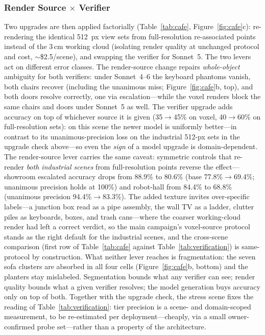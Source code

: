 \documentclass[electronics,article,accept,pdftex,moreauthors]{Definitions/mdpi}
\begin{document}
\subsubsection{Render Source $\times$ Verifier}
Two upgrades are then applied factorially (Table~\ref{tab:cafe},
Figure~\ref{fig:cafe}c): re-rendering the identical 512~px view sets
from full-resolution re-associated points instead of the 3\,cm working
cloud (isolating render quality at unchanged protocol and cost,
$\sim$\$2.5/scene), and swapping the verifier for Sonnet~5. The two
levers act on different error classes. The render-source change
repairs \emph{whole-object} ambiguity for both verifiers: under
Sonnet~4--6 the keyboard phantoms vanish, both chairs recover
(including the unanimous miss; Figure~\ref{fig:cafe}b, top), and both
doors resolve correctly, one via escalation---while the voxel renders
block the same chairs and doors under Sonnet~5 as well. The verifier
upgrade adds accuracy on top of whichever source it is given
(35$\rightarrow$45\% on voxel, 40$\rightarrow$60\% on full-resolution
sets): on this scene the newer model is uniformly better---in contrast
to its unanimous-precision loss on the industrial 512-px sets in the
upgrade check above---so even the \emph{sign} of a model upgrade is
domain-dependent. The render-source lever carries the same caveat: symmetric controls
that re-render \emph{both industrial scenes} from full-resolution
points reverse the effect---showroom escalated accuracy drops from
88.9\% to 80.6\% (base 77.8\%$\rightarrow$69.4\%; unanimous precision
holds at 100\%) and robot-hall from 84.4\% to 68.8\% (unanimous
precision 94.4\%$\rightarrow$83.3\%). The added texture invites
over-specific labels---a junction box read as a pipe assembly, the
wall TV as a ladder, clutter piles as keyboards, boxes, and trash
cans---where the coarser working-cloud render had left a correct
verdict, so the main campaign's voxel-source protocol stands as the
right default for the industrial scenes, and the cross-scene
comparison (first row of Table~\ref{tab:cafe} against
Table~\ref{tab:verification}) is same-protocol by construction. What
neither lever reaches is fragmentation: the seven sofa clusters are
absorbed in all four cells (Figure~\ref{fig:cafe}b, bottom) and the
planters stay mislabeled.
Segmentation bounds what any verifier can see; render quality bounds
what a given verifier resolves; the model generation buys accuracy
only on top of both. Together with the upgrade check, the stress scene
fixes the reading of Table~\ref{tab:verification}: tier precision is a
scene- and domain-scoped measurement, to be re-estimated per
deployment---cheaply, via a small owner-confirmed probe set---rather
than a property of the architecture.
\end{document}
